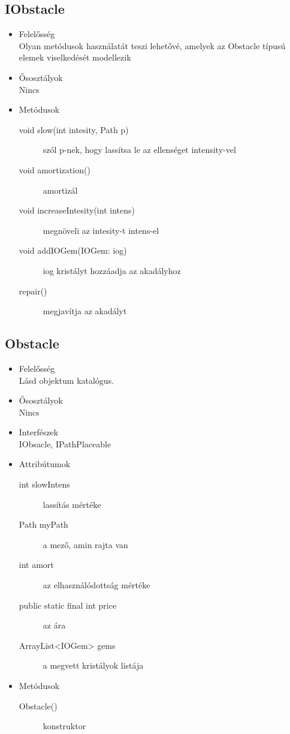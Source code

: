 \subsection{IObstacle}
\begin{itemize}
\item Felelősség\\
Olyan metódusok használatát teszi lehetővé, amelyek az Obstacle típusú elemek viselkedését modellezik
\item Ősosztályok\\
Nincs

\item Metódusok\\
	\begin{description}
		\item[void slow(int intesity, Path p)] szól p-nek, hogy lassítsa le az ellenséget intensity-vel
\item[void amortization()] amortizál
\item[void increaseIntesity(int intens)] megnöveli az intesity-t intens-el
\item[void addIOGem(IOGem: iog)] iog kristályt hozzáadja az akadályhoz
\item[repair()] megjavítja az akadályt


		
		
	\end{description}
\end{itemize}
\subsection{Obstacle}
\begin{itemize}
\item Felelősség\\
Lásd objektum katalógus. 
\item Ősosztályok\\
Nincs
\item Interfészek\\
IObsacle, IPathPlaceable
\item Attribútumok\\
	\begin{description}
	\item[int slowIntens] lassítás mértéke
\item[Path myPath] a mező, amin rajta van
\item[int amort] az elhasználódottság mértéke
\item[public static final int price] az ára
\item[ArrayList<IOGem> gems] a megvett kristályok listája


	\end{description}
\item Metódusok\\
	\begin{description}
		
		\item[Obstacle()] konstruktor
		
		
	\end{description}
\end{itemize}
